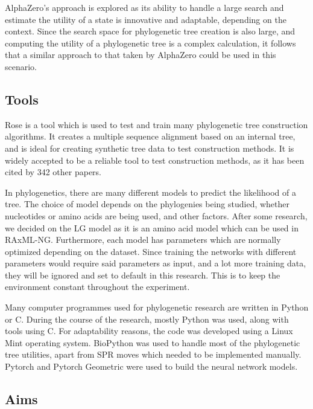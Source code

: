 \documentclass{mpaper}
\begin{document}
AlphaZero's approach is explored as its ability to handle a large search and estimate the utility of a state is innovative and adaptable, depending on the context. Since the search space for phylogenetic tree creation is also large, and computing the utility of a phylogenetic tree is a complex calculation, it follows that a similar approach to that taken by AlphaZero could be used in this scenario. 

\subsection{Tools}

Rose \cite{stoye1998rose} is a tool which is used to test and train many phylogenetic tree construction algorithms. It creates a multiple sequence alignment based on an internal tree, and is ideal for creating synthetic tree data to test construction methods. It is widely accepted to be a reliable tool to test construction methods, as it has been cited by 342 other papers.

In phylogenetics, there are many different models to predict the likelihood of a tree. The choice of model depends on the phylogenies being studied, whether nucleotides or amino acids are being used, and other factors. After some research, we decided on the LG model as it is an amino acid model which can be used in RAxML-NG. Furthermore, each model has parameters which are normally optimized depending on the dataset. Since training the networks with different parameters would require said parameters as input, and a lot more training data, they will be ignored and set to default in this research. This is to keep the environment constant throughout the experiment.   

 Many computer programmes used for phylogenetic research are written in Python or C. During the course of the research, mostly Python was used, along with tools using C. For adaptability reasons, the code was developed using a Linux Mint operating system. BioPython \cite{cock2009biopython} was used to handle most of the phylogenetic tree utilities, apart from SPR moves which needed to be implemented manually. Pytorch \cite{NEURIPS2019_9015} and Pytorch Geometric \cite{fey2019fast} were used to build the neural network models. 


\subsection{Aims}
\end{document}
